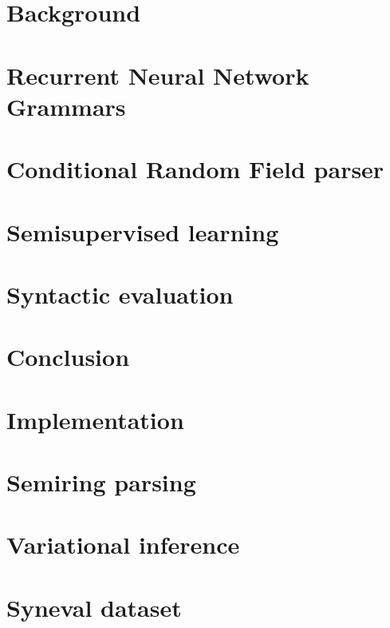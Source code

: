 \documentclass{uvamath}
\theoremstyle{remark}
\theoremstyle{definition}
\theoremstyle{definition}
\theoremstyle{definition}
\theoremstyle{definition}
\theoremstyle{definition}
\begin{document}
\chapter{Background}
\label{02-background}



\chapter{Recurrent Neural Network Grammars}
\label{03-rnng}



\chapter{Conditional Random Field parser}
\label{04-crf}



\chapter{Semisupervised learning}
\label{05-semisupervised}



\chapter{Syntactic evaluation}
\label{06-syneval}



\chapter{Conclusion}
\label{07-conclusion}



\appendix

\chapter{Implementation}
\label{A2-implementation}



\chapter{Semiring parsing}
\label{A3-crf}



\chapter{Variational inference}
\label{A4-vi}



\chapter{Syneval dataset}
\label{A5-syneval}





\end{document}
